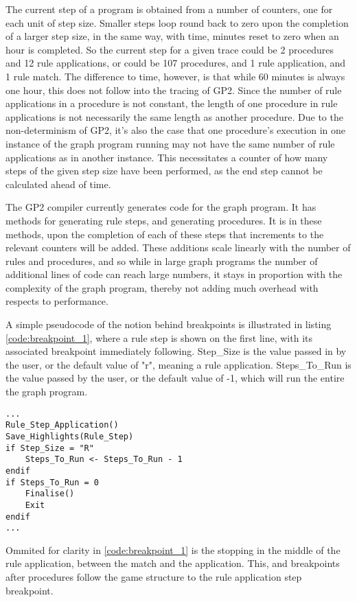 \documentclass{UoYCSproject}
\begin{document}
The current step of a program is obtained from a number of counters, one for each unit of step size. Smaller steps loop round back to zero upon the completion of a larger step size, in the same way, with time, minutes reset to zero when an hour is completed. So the current step for a given trace could be 2 procedures and 12 rule applications, or could be 107 procedures, and 1 rule application, and 1 rule match. The difference to time, however, is that while 60 minutes is always one hour, this does not follow into the tracing of GP2. Since the number of rule applications in a procedure is not constant, the length of one procedure in rule applications is not necessarily the same length as another procedure. Due to the non-determinism of GP2, it's also the case that one procedure's execution in one instance of the graph program running may not have the same number of rule applications as in another instance. This necessitates a counter of how many steps of the given step size have been performed, as the end step cannot be calculated ahead of time. 

The GP2 compiler currently generates code for the graph program. It has methods for generating rule steps, and generating procedures. It is in these methods, upon the completion of each of these steps that increments to the relevant counters will be added. These additions scale linearly with the number of rules and procedures, and so while in large graph programs the number of additional lines of code can reach large numbers, it stays in proportion with the complexity of the graph program, thereby not adding much overhead with respects to performance.

A simple pseudocode of the notion behind breakpoints is illustrated in listing \ref{code:breakpoint_1}, where a rule step is shown on the first line, with its associated breakpoint immediately following. Step\_Size is the value passed in by the user, or the default value of "r", meaning a rule application. Steps\_To\_Run is the value passed by the user, or the default value of -1, which will run the entire the graph program.

\begin{lstlisting}[label=code:breakpoint_1, caption=Pseudocode of breakpoints]
...
Rule_Step_Application()
Save_Highlights(Rule_Step)
if Step_Size = "R"
    Steps_To_Run <- Steps_To_Run - 1
endif
if Steps_To_Run = 0
    Finalise()
    Exit
endif
...
\end{lstlisting}

Ommited for clarity in \ref{code:breakpoint_1} is the stopping in the middle of the rule application, between the match and the application. This, and breakpoints after procedures follow the game structure to the rule application step breakpoint.
\end{document}

